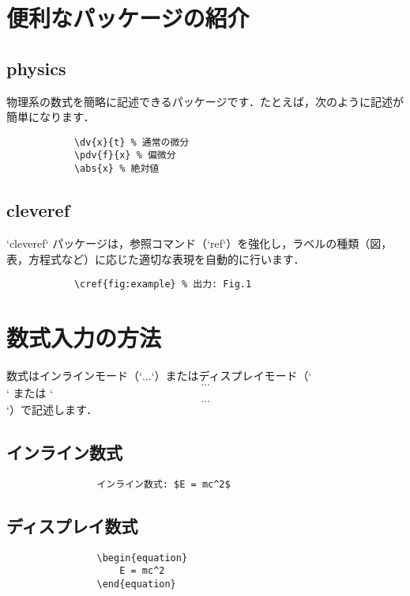     \section{便利なパッケージの紹介}
        \subsection{physics}
        物理系の数式を簡略に記述できるパッケージです．たとえば，次のように記述が簡単になります．

            \begin{verbatim}
            \dv{x}{t} % 通常の微分
            \pdv{f}{x} % 偏微分
            \abs{x} % 絶対値
            \end{verbatim}

        \subsection{cleveref}
        `cleveref` パッケージは，参照コマンド（`ref{}`）を強化し，ラベルの種類（図，表，方程式など）に応じた適切な表現を自動的に行います．

            \begin{verbatim}
            \cref{fig:example} % 出力: Fig.1
            \end{verbatim}

    \section{数式入力の方法}
        数式はインラインモード（`$...$`）またはディスプレイモード（`$$...$$` または `\begin{equation}...\end{equation}`）で記述します．

        \subsection{インライン数式}
            \begin{verbatim}
                インライン数式: $E = mc^2$
            \end{verbatim}

        \subsection{ディスプレイ数式}
            \begin{verbatim}
                \begin{equation}
                    E = mc^2
                \end{equation}
            \end{verbatim}

